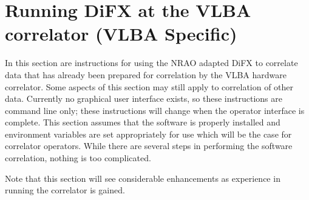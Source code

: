 


\section{Running DiFX at the VLBA correlator {\small (VLBA Specific)}} \label{sec:run}

In this section are instructions for using the NRAO adapted DiFX to correlate data that has already been prepared for correlation by the VLBA hardware correlator.
Some aspects of this section may still apply to correlation of other data.
Currently no graphical user interface exists, so these instructions are command line only; these instructions will change when the operator interface is complete.
This section assumes that the software is properly installed and environment variables are set appropriately for use which will be the case for correlator operators.
While there are several steps in performing the software correlation, nothing is too complicated.

Note that this section will see considerable enhancements as experience in running the correlator is gained.

